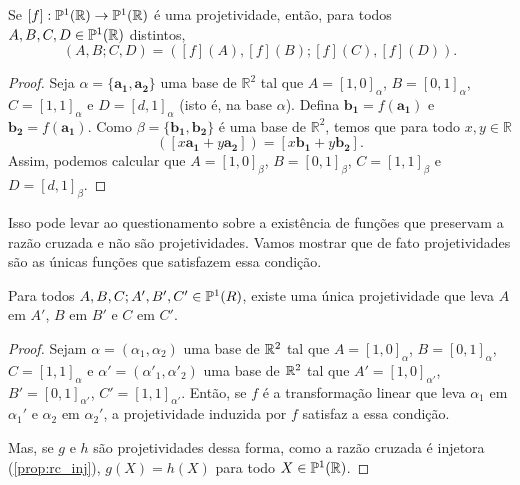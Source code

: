 \begin{thm}
Se \([f]:\mathbb{P}^1(\mathbb{R}) \to \mathbb{P}^1(\mathbb{R})\) é uma projetividade, então, para todos \(A,B,C,D \in \mathbb{P}^1(\mathbb{R})\) distintos, 
\begin{equation}
  (A,B;C,D) = ([f](A),[f](B);[f](C),[f](D)).
\end{equation}
\end{thm}

\begin{proof}
Seja \(\alpha = \{\mathbf{a_1},\mathbf{a_2}\}\) uma base de \(\mathbb{R}^2\) tal que \(A = [1, 0]_\alpha\), \(B = [0, 1]_\alpha\), \(C = [1, 1]_\alpha\) e \(D = [d, 1]_\alpha\) (isto é, na base \(\alpha\)).
Defina \(\mathbf{b_1} = f(\mathbf{a_1})\) e \(\mathbf{b_2} = f(\mathbf{a_1})\).
Como \(\beta = \{\mathbf{b_1}, \mathbf{b_2}\}\) é uma base de \(\mathbb{R}^2\), temos que para todo \(x, y\in \mathbb{R}\)
\begin{equation}
  [f]([x\mathbf{a_1} + y\mathbf{a_2}]) = [x\mathbf{b_1} + y\mathbf{b_2}].
\end{equation}
Assim, podemos calcular que 
\(A = [1, 0]_\beta\), \(B = [0, 1]_\beta\), \(C = [1, 1]_\beta\) e \(D = [d, 1]_\beta\).
\end{proof}

Isso pode levar ao questionamento sobre a existência de funções que preservam a razão cruzada e não são projetividades. Vamos mostrar que de fato projetividades são as únicas funções que satisfazem essa condição.

\begin{lem}
Para todos \(A,B,C;A',B',C' \in \mathbb{P}^1(R)\), existe uma única projetividade que leva \(A\) em \(A'\), \(B\) em \(B'\) e \(C\) em \(C'\).
\end{lem}

\begin{proof}
Sejam \(\alpha = (\alpha_1, \alpha_2)\) uma base de \(\mathbb{R}^2\) tal que \(A = [1, 0]_\alpha\), \(B = [0, 1]_\alpha\), \(C = [1, 1]_\alpha\) e \(\alpha' = (\alpha'_1, \alpha'_2)\) uma base de \(\mathbb{R}^2\) tal que \(A' = [1, 0]_{\alpha'}\), \(B' = [0, 1]_{\alpha'}\), \(C' = [1, 1]_{\alpha'}\). Então, se \(f\) é a transformação linear que leva \(\alpha_1\) em \(\alpha_1'\) e \(\alpha_2\) em \(\alpha_2'\), a projetividade induzida por \(f\) satisfaz a essa condição.

Mas, se \(g\) e \(h\) são projetividades dessa forma, como a razão cruzada é injetora (\ref{prop:rc_inj}),
\(g(X) = h(X)\) para todo \(X\in \mathbb{P}^1(\mathbb{R})\).
\end{proof}

